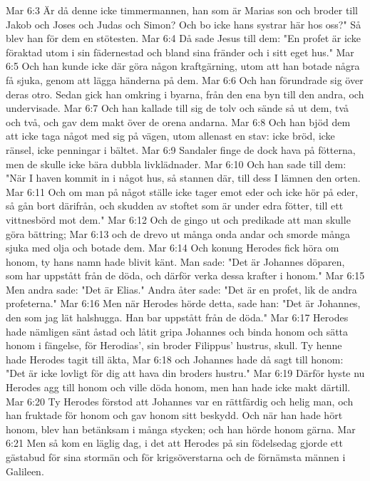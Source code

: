 Mar 6:3  Är då denne icke timmermannen, han som är Marias son och broder till Jakob och Joses och Judas och Simon? Och bo icke hans systrar här hos oss?" Så blev han för dem en stötesten.
Mar 6:4  Då sade Jesus till dem: "En profet är icke föraktad utom i sin fädernestad och bland sina fränder och i sitt eget hus."
Mar 6:5  Och han kunde icke där göra någon kraftgärning, utom att han botade några få sjuka, genom att lägga händerna på dem.
Mar 6:6  Och han förundrade sig över deras otro. Sedan gick han omkring i byarna, från den ena byn till den andra, och undervisade.
Mar 6:7  Och han kallade till sig de tolv och sände så ut dem, två och två, och gav dem makt över de orena andarna.
Mar 6:8  Och han bjöd dem att icke taga något med sig på vägen, utom allenast en stav: icke bröd, icke ränsel, icke penningar i bältet.
Mar 6:9  Sandaler finge de dock hava på fötterna, men de skulle icke bära dubbla livklädnader.
Mar 6:10  Och han sade till dem: "När I haven kommit in i något hus, så stannen där, till dess I lämnen den orten.
Mar 6:11  Och om man på något ställe icke tager emot eder och icke hör på eder, så gån bort därifrån, och skudden av stoftet som är under edra fötter, till ett vittnesbörd mot dem."
Mar 6:12  Och de gingo ut och predikade att man skulle göra bättring;
Mar 6:13  och de drevo ut många onda andar och smorde många sjuka med olja och botade dem.
Mar 6:14  Och konung Herodes fick höra om honom, ty hans namn hade blivit känt. Man sade: "Det är Johannes döparen, som har uppstått från de döda, och därför verka dessa krafter i honom."
Mar 6:15  Men andra sade: "Det är Elias." Andra åter sade: "Det är en profet, lik de andra profeterna."
Mar 6:16  Men när Herodes hörde detta, sade han: "Det är Johannes, den som jag lät halshugga. Han bar uppstått från de döda."
Mar 6:17  Herodes hade nämligen sänt åstad och låtit gripa Johannes och binda honom och sätta honom i fängelse, för Herodias', sin broder Filippus' hustrus, skull. Ty henne hade Herodes tagit till äkta,
Mar 6:18  och Johannes hade då sagt till honom: "Det är icke lovligt för dig att hava din broders hustru."
Mar 6:19  Därför hyste nu Herodes agg till honom och ville döda honom, men han hade icke makt därtill.
Mar 6:20  Ty Herodes förstod att Johannes var en rättfärdig och helig man, och han fruktade för honom och gav honom sitt beskydd. Och när han hade hört honom, blev han betänksam i många stycken; och han hörde honom gärna.
Mar 6:21  Men så kom en läglig dag, i det att Herodes på sin födelsedag gjorde ett gästabud för sina stormän och för krigsöverstarna och de förnämsta männen i Galileen.
